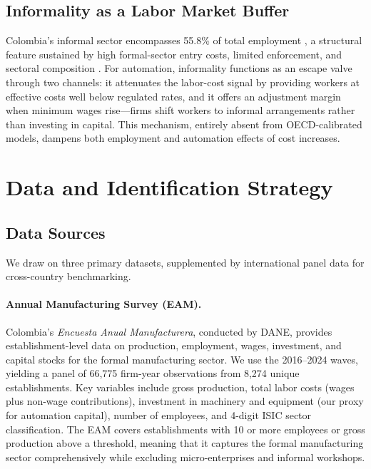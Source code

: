 \documentclass[5p,times,authoryear]{elsarticle}
\begin{document}
\subsection{Informality as a Labor Market Buffer}
\label{subsec:informality}

Colombia's informal sector encompasses 55.8\% of total employment \citep{arias2023informality}, a structural feature sustained by high formal-sector entry costs, limited enforcement, and sectoral composition \citep{laporta2014}. For automation, informality functions as an escape valve through two channels: it attenuates the labor-cost signal by providing workers at effective costs well below regulated rates, and it offers an adjustment margin when minimum wages rise---firms shift workers to informal arrangements rather than investing in capital. This mechanism, entirely absent from OECD-calibrated models, dampens both employment and automation effects of cost increases.

\FloatBarrier


\section{Data and Identification Strategy}
\label{sec:data}

\subsection{Data Sources}
\label{subsec:data_sources}

We draw on three primary datasets, supplemented by international panel data for cross-country benchmarking.

\paragraph{Annual Manufacturing Survey (EAM).} Colombia's \textit{Encuesta Anual Manufacturera}, conducted by DANE, provides establishment-level data on production, employment, wages, investment, and capital stocks for the formal manufacturing sector. We use the 2016--2024 waves, yielding a panel of 66,775 firm-year observations from 8,274 unique establishments. Key variables include gross production, total labor costs (wages plus non-wage contributions), investment in machinery and equipment (our proxy for automation capital), number of employees, and 4-digit ISIC sector classification. The EAM covers establishments with 10 or more employees or gross production above a threshold, meaning that it captures the formal manufacturing sector comprehensively while excluding micro-enterprises and informal workshops.
\end{document}
